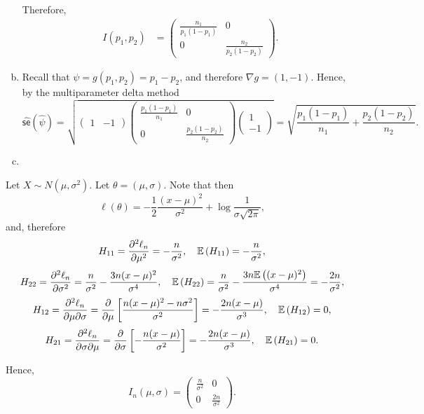 \begin{ex}
\begin{enumerate}[(a)]
          Therefore,
          \begin{align*}
            I(p_1, p_2)
             & =\begin{pmatrix}
              \frac{n_1}{p_1(1-p_1)} & 0                      \\
              0                      & \frac{n_2}{p_2(1-p_2)}
            \end{pmatrix}.
          \end{align*}
    \item Recall that $\psi=g(p_1,p_2)=p_1-p_2$, and therefore
          $\nabla g=(1,-1)$. Hence, by the multiparameter delta method
          \[
            \widehat{\textsf{se}}(\widehat{\psi})
            =\sqrt{
              \begin{pmatrix}
                1 & -1
              \end{pmatrix}
              \begin{pmatrix}
                \frac{p_1(1-p_1)}{n_1} & 0                      \\
                0                      & \frac{p_2(1-p_2)}{n_2}
              \end{pmatrix}
              \begin{pmatrix}
                1 \\ -1
              \end{pmatrix}
            }
            =\sqrt{\frac{p_1(1-p_1)}{n_1} + \frac{p_2(1-p_2)}{n_2}}.
          \]
    \item
          \inputminted{python}{../code/09-07.py}
          \inputminted{text}{../output/09-07.txt}
  \end{enumerate}
\end{ex}

\begin{ex}
  Let $X\sim N(\mu,\sigma^2)$. Let $\theta=(\mu,\sigma)$. Note that then
  \[
    \ell(\theta)
    =-\frac{1}{2}\frac{(x-\mu)^2}{\sigma^2}+\log{\frac{1}{\sigma\sqrt{2\pi}}},
  \]
  and, therefore
  \[
    H_{11}
    =\frac{\partial^2\ell_n}{\partial\mu^2}
    =-\frac{n}{\sigma^2},\quad
    \mathbb{E}\left(H_{11}\right) =-\frac{n}{\sigma^2},
  \]
  \[
    H_{22}
    =\frac{\partial^2\ell_n}{\partial\sigma^2}
    =\frac{n}{\sigma^2}-\frac{3n(x-\mu)^2}{\sigma^4},\quad
    \mathbb{E}\left(H_{22}\right)=\frac{n}{\sigma^2}-\frac{3n\mathbb{E}\left((x-\mu)^2\right)}{\sigma^4}
    =-\frac{2n}{\sigma^2},
  \]
  \[
    H_{12}
    =\frac{\partial^2\ell_n}{\partial\mu\partial\sigma}
    =\frac{\partial}{\partial\mu}\left[\frac{n(x-\mu)^2-n\sigma^2}{\sigma^2}\right]
    =-\frac{2n(x-\mu)}{\sigma^3},\quad
    \mathbb{E}\left(H_{12}\right) = 0,
  \]
  \[
    H_{21}
    =\frac{\partial^2\ell_n}{\partial\sigma\partial\mu}
    =\frac{\partial}{\partial\sigma}\left[-\frac{n(x-\mu)}{\sigma^2}\right]
    =-\frac{2n(x-\mu)}{\sigma^3},\quad
    \mathbb{E}\left(H_{21}\right) = 0.
  \]

  Hence,
  \[
    I_n(\mu,\sigma)
    =\begin{pmatrix}
      \frac{n}{\sigma^2} & 0                   \\
      0                  & \frac{2n}{\sigma^2}
    \end{pmatrix}.
  \]
\end{ex}

